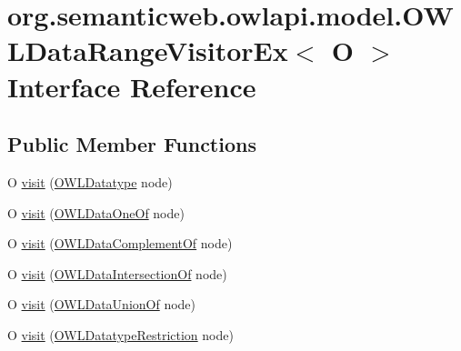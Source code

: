 \hypertarget{interfaceorg_1_1semanticweb_1_1owlapi_1_1model_1_1_o_w_l_data_range_visitor_ex_3_01_o_01_4}{\section{org.\-semanticweb.\-owlapi.\-model.\-O\-W\-L\-Data\-Range\-Visitor\-Ex$<$ O $>$ Interface Reference}
\label{interfaceorg_1_1semanticweb_1_1owlapi_1_1model_1_1_o_w_l_data_range_visitor_ex_3_01_o_01_4}
}
\subsection*{Public Member Functions}
\begin{DoxyCompactItemize}
\item 
O \hyperlink{interfaceorg_1_1semanticweb_1_1owlapi_1_1model_1_1_o_w_l_data_range_visitor_ex_3_01_o_01_4_a74b8a08b93e6b1f20e1cb98a159bde9c}{visit} (\hyperlink{interfaceorg_1_1semanticweb_1_1owlapi_1_1model_1_1_o_w_l_datatype}{O\-W\-L\-Datatype} node)
\item 
O \hyperlink{interfaceorg_1_1semanticweb_1_1owlapi_1_1model_1_1_o_w_l_data_range_visitor_ex_3_01_o_01_4_abcb91f0b073decf101be7c622b39b512}{visit} (\hyperlink{interfaceorg_1_1semanticweb_1_1owlapi_1_1model_1_1_o_w_l_data_one_of}{O\-W\-L\-Data\-One\-Of} node)
\item 
O \hyperlink{interfaceorg_1_1semanticweb_1_1owlapi_1_1model_1_1_o_w_l_data_range_visitor_ex_3_01_o_01_4_aaab0de64b1adbc3fec889acae7c4d69c}{visit} (\hyperlink{interfaceorg_1_1semanticweb_1_1owlapi_1_1model_1_1_o_w_l_data_complement_of}{O\-W\-L\-Data\-Complement\-Of} node)
\item 
O \hyperlink{interfaceorg_1_1semanticweb_1_1owlapi_1_1model_1_1_o_w_l_data_range_visitor_ex_3_01_o_01_4_a163c77772a9dc376383d47c834dd08d3}{visit} (\hyperlink{interfaceorg_1_1semanticweb_1_1owlapi_1_1model_1_1_o_w_l_data_intersection_of}{O\-W\-L\-Data\-Intersection\-Of} node)
\item 
O \hyperlink{interfaceorg_1_1semanticweb_1_1owlapi_1_1model_1_1_o_w_l_data_range_visitor_ex_3_01_o_01_4_a757569fdd7a46f6bb914e9ce819feaeb}{visit} (\hyperlink{interfaceorg_1_1semanticweb_1_1owlapi_1_1model_1_1_o_w_l_data_union_of}{O\-W\-L\-Data\-Union\-Of} node)
\item 
O \hyperlink{interfaceorg_1_1semanticweb_1_1owlapi_1_1model_1_1_o_w_l_data_range_visitor_ex_3_01_o_01_4_a4d47df840e321d8267cacfe8dc596773}{visit} (\hyperlink{interfaceorg_1_1semanticweb_1_1owlapi_1_1model_1_1_o_w_l_datatype_restriction}{O\-W\-L\-Datatype\-Restriction} node)
\end{DoxyCompactItemize}


